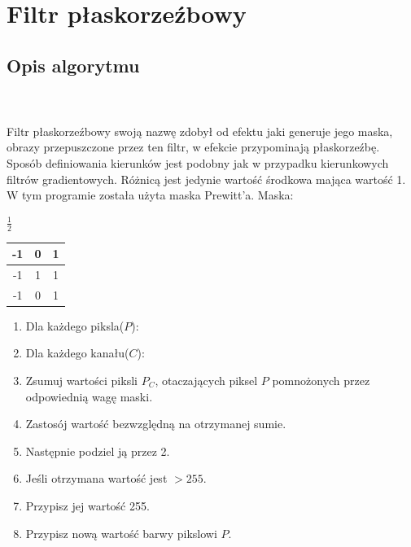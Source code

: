 \documentclass[final,a4paper,openany,12pt]{mwbk}
\begin{document}
\section{Filtr płaskorzeźbowy}
\subsection*{Opis algorytmu}
\hfill
\\\\
\indent Filtr płaskorzeźbowy swoją nazwę zdobył od efektu jaki generuje jego maska, obrazy przepuszczone przez ten filtr, w efekcie przypominają płaskorzeźbę. Sposób definiowania kierunków jest podobny jak w przypadku kierunkowych filtrów gradientowych. Różnicą jest jedynie wartość środkowa mająca wartość 1. W tym programie została użyta maska Prewitt'a. Maska:

\begin{center}
	$\frac{1}{2}$ 
	\begin{tabular}{|c|c|c|}
		\hline
		-1 & 0 & 1\\
		\hline
		-1 & 1 & 1\\
		\hline
		-1 & 0 & 1\\
		\hline
	\end{tabular}
\end{center}

\begin{enumerate}
	\item Dla każdego piksla($P$):
	\item Dla każdego kanału($C$):
	\item Zsumuj wartości piksli $P_C$, otaczających piksel $P$ pomnożonych przez odpowiednią wagę maski.
	\item Zastosój wartość bezwzględną na otrzymanej sumie.
	\item Następnie podziel ją przez 2.
	\item Jeśli otrzymana wartość jest $> 255$.
	\item Przypisz jej wartość 255.
	\item Przypisz nową wartość barwy pikslowi $P$.
\end{enumerate}
\end{document}
